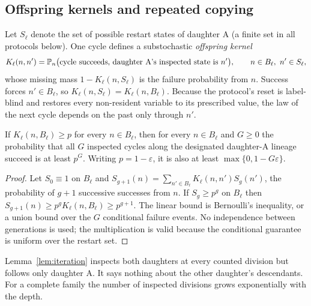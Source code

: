 \subsection{Offspring kernels and repeated copying}
Let $S_\ell$ denote the set of possible restart states of daughter A (a finite set in all protocols below). One cycle defines a substochastic \emph{offspring kernel}
\[
 K_\ell(n,n')=\mathbb P_n\bigl(\text{cycle succeeds, daughter A's inspected state is }n'\bigr),\qquad n\in B_\ell,\ n'\in S_\ell,
\]
whose missing mass $1-K_\ell(n,S_\ell)$ is the failure probability from $n$. Success forces $n'\in B_\ell$, so $K_\ell(n,S_\ell)=K_\ell(n,B_\ell)$. Because the protocol's reset is label-blind and restores every non-resident variable to its prescribed value, the law of the next cycle depends on the past only through $n'$.

\begin{lemma}\label{lem:iteration}
If $K_\ell(n,B_\ell)\ge p$ for every $n\in B_\ell$, then for every $n\in B_\ell$ and $G\ge0$ the probability that all $G$ inspected cycles along the designated daughter-A lineage succeed is at least $p^G$. Writing $p=1-\varepsilon$, it is also at least $\max\{0,1-G\varepsilon\}$.
\end{lemma}
\begin{proof}
Let $S_0\equiv1$ on $B_\ell$ and $S_{g+1}(n)=\sum_{n'\in B_\ell}K_\ell(n,n')S_g(n')$, the probability of $g+1$ successive successes from $n$. If $S_g\ge p^g$ on $B_\ell$ then $S_{g+1}(n)\ge p^g K_\ell(n,B_\ell)\ge p^{g+1}$. The linear bound is Bernoulli's inequality, or a union bound over the $G$ conditional failure events. No independence between generations is used; the multiplication is valid because the conditional guarantee is uniform over the restart set.
\end{proof}

Lemma~\ref{lem:iteration} inspects both daughters at every counted division but follows only daughter A. It says nothing about the other daughter's descendants. For a complete family the number of inspected divisions grows exponentially with the depth.

